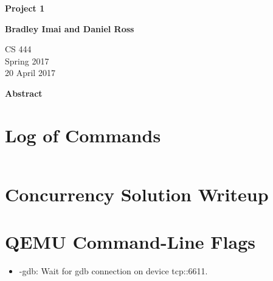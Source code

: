 \documentclass[letterpaper,10pt,titlepage]{article}
\begin{document}
\begin{titlepage}
    \begin{center}
        \vspace*{3.5cm}

        \textbf{Project 1}

        \vspace{0.5cm}

        \textbf{Bradley Imai and Daniel Ross}

        \vspace{0.8cm}

        CS 444\\
        Spring 2017\\
        20 April 2017\\

        \vspace{1cm}

        \textbf{Abstract}\\

        \vspace{0.5cm}


        \vfill



    \end{center}
\end{titlepage}

\newpage

\section{Log of Commands}


\begin{lstlisting}
\end{lstlisting}

\section{Concurrency Solution Writeup}


\section{QEMU Command-Line Flags}

\begin{itemize}
  \item -gdb: Wait for gdb connection on device tcp::6611.


\end{itemize}

\newpage
\end{document}
